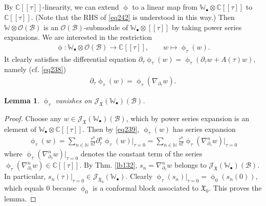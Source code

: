 \documentclass[12pt,a4paper,notitlepage]{article}
\theoremstyle{definition}
\theoremstyle{plain}
\newtheorem{lm}[df]{Lemma}
\newcommand{\fk}{\mathfrak}
\newcommand{\mc}{\mathcal}
\newcommand{\scr}{\mathscr}
\newcommand{\blt}{\bullet}
\newcommand{\Wbb}{\mathbb W}
\newcommand{\Cbb}{\mathbb C}
\newcommand{\Nbb}{\mathbb N}
\numberwithin{equation}{section}
\begin{document}
\subsection{}

By $\Cbb[[\tau]]$-linearity, we can extend $\upphi$ to a linear map from $\Wbb_\blt\otimes\Cbb[[\tau]]$ to $\Cbb[[\tau]]$. (Note that the RHS of \eqref{eq242} is understood in this way.) Then $\Wbb\otimes\scr O(\mc B)$ is an $\scr O(\mc B)$-submodule of $\Wbb_\blt\otimes[[\tau]]$ by taking power series expansions. We are interested in the restriction
\begin{align*}
\upphi:\Wbb_\blt\otimes\scr O(\mc B)\rightarrow\Cbb[[\tau]],\qquad w\mapsto \upphi_\tau(w).
\end{align*}
It clearly satisfies the differential equation $\partial_\tau\upphi_\tau(w)=\upphi_\tau (\partial_\tau w+A(\tau)w)$, namely (cf. \eqref{eq238})
\begin{align}
\partial_\tau\upphi_\tau(w)=\upphi_\tau(\nabla_{\partial_\tau} w).\label{eq239}
\end{align}

\begin{lm}\label{lb140}
$\upphi_\tau$ vanishes on $\scr J_{\fk X}(\Wbb_\blt)(\mc B)$.
\end{lm}


\begin{proof}
Choose any $w\in \scr J_{\fk X}(\Wbb_\blt)(\mc B)$, which by power series expansion is an element of $\Wbb_\blt\otimes\Cbb[[\tau]]$. Then by \eqref{eq239}, $\upphi_\tau(w)$ has series expansion
\begin{align*}
\upphi_\tau(w)=\sum_{n\in\Nbb}\frac {\tau^n}{n!}\partial^n_\tau\upphi_\tau(w)\big|_{\tau=0}=\sum_{n\in\Nbb}\frac {\tau^n}{n!}\upphi_\tau(\nabla^n_{\partial_\tau} w)\big|_{\tau=0}
\end{align*}
where $\upphi_\tau(\nabla^n_{\partial_\tau} w)\big|_{\tau=0}$ denotes the constant term of the series $\upphi_\tau(\nabla^n_{\partial_\tau} w)\in\Cbb[[\tau]]$. By Thm. \ref{lb132},  $s_n=\nabla^n_{\partial_\tau}w$ belongs to $\scr J_{\fk X}(\Wbb_\blt)(\mc B)$. In particular, $s_n(\tau)|_{\tau=0}\in\scr J_{\fk X_0}(\Wbb_\blt)$. Clearly $\upphi_\tau(s_n)|_{\tau=0}=\upphi_0(s_n(0))$, which equals $0$ because $\upphi_0$ is a conformal block associated to $\fk X_0$. This proves the lemma.
\end{proof}



\subsection{}
\end{document}
